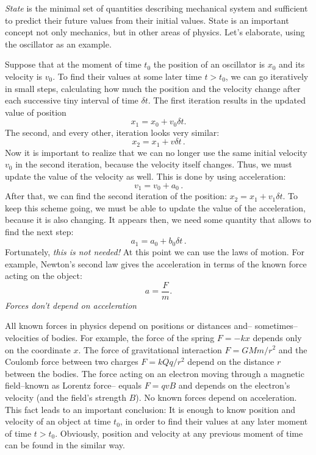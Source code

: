 \emph{State} is the minimal set of quantities describing mechanical
system and sufficient to predict
their future values from their initial values. State is an important
concept not only mechanics, but in other areas of physics.
Let's elaborate, using the oscillator as an example.

Suppose that at the moment of time $t_{0}$ the position of an oscillator
is $x_{0}$ and its velocity is $v_{0}$. To find their values at
some later time $t>t_{0}$, we can go iteratively in small steps, calculating
how much the position and the velocity change after each successive
tiny interval of time $\delta t$. The first iteration results in
the updated value of position
\[
	x_{1}=x_{0}+v_{0}\delta t.
\]
The second, and every other, iteration looks very similar:
\[
	x_{2}=x_{1}+v\delta t\,.
\]
Now it is important to realize that we can no longer use the same initial
velocity $v_{0}$ in the second iteration, because the velocity itself
changes. Thus, we must update the value of the velocity as well. This
is done by using acceleration:
\[
	v_{1}=v_{0}+a_{0}\,.
\]
After that, we can find the second iteration of the position:
$x_{2}=x_{1}+v_{1}\delta t$. To keep this scheme going, we must be
able to update the value of the acceleration, because it is also changing.
It appears then, we need some quantity that allows to find the next
step:
\[
	a_{1}=a_{0}+b_{0}\delta t\,.
\]
Fortunately, \emph{this is not needed!} At this point we can use the laws of motion.
For example, Newton's second law gives the acceleration in terms of the known force acting on the object:
\begin{equation}
	a=\frac{F}{m}.
\end{equation}
{\it Forces don't depend on acceleration}

All known forces in physics depend on positions or distances and--
sometimes-- velocities of bodies. For example, the force of the spring $F=-kx$
depends only on the coordinate $x$. The force of gravitational interaction $F=GMm/r^2$
and the Coulomb force between two charges $F=kQq/r^2$ depend on the distance
$r$ between the bodies. The force acting on an electron moving through
a magnetic field--known as Lorentz force-- equals $F=qvB$ and 
depends on the electron's velocity (and the field's strength $B$). 
No known forces depend on acceleration. This fact leads to an important conclusion:
It is enough to know position and velocity of an object at time $t_{0}$,
in order to find their values at any later moment of time $t>t_{0}$.
Obviously, position and velocity at any previous moment of time can
be found in the similar way.

